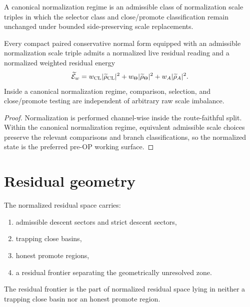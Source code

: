 \begin{definition}\label{def:canonical-normalization-regime}
A canonical normalization regime is an admissible class of normalization scale triples in which the selector class and close/promote classification remain unchanged under bounded side-preserving scale replacements.
\end{definition}

\begin{theorem}\label{thm:normalization-theorem}
Every compact paired conservative normal form equipped with an admissible normalization scale triple admits a normalized live residual reading and a normalized weighted residual energy
\[
\widetilde{\mathcal{E}}_{w}=w_{\mathrm{CL}}|\widetilde{\rho}_{\mathrm{CL}}|^2+w_{\Theta}|\widetilde{\rho}_{\Theta}|^2+w_A|\widetilde{\rho}_{A}|^2.
\]
Inside a canonical normalization regime, comparison, selection, and close/promote testing are independent of arbitrary raw scale imbalance.
\end{theorem}

\begin{proof}
Normalization is performed channel-wise inside the route-faithful split. Within the canonical normalization regime, equivalent admissible scale choices preserve the relevant comparisons and branch classifications, so the normalized state is the preferred pre-OP working surface.
\end{proof}

\section{Residual geometry}
\begin{definition}\label{def:normalized-residual-geometry}
The normalized residual space carries:
\begin{enumerate}[leftmargin=2em]
  \item admissible descent sectors and strict descent sectors,
  \item trapping close basins,
  \item honest promote regions,
  \item a residual frontier separating the geometrically unresolved zone.
\end{enumerate}
\end{definition}

\begin{definition}\label{def:residual-frontier}
The residual frontier is the part of normalized residual space lying in neither a trapping close basin nor an honest promote region.
\end{definition}


